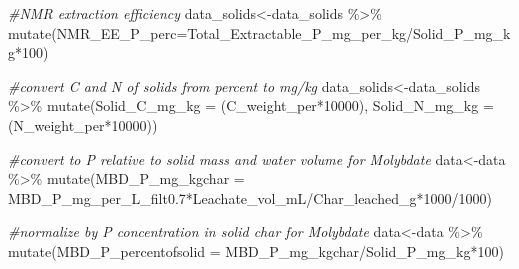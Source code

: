\documentclass[
]{article}
\newenvironment{Shaded}{\begin{snugshade}}{\end{snugshade}}
\newcommand{\AttributeTok}[1]{\textcolor[rgb]{0.77,0.63,0.00}{#1}}
\newcommand{\CommentTok}[1]{\textcolor[rgb]{0.56,0.35,0.01}{\textit{#1}}}
\newcommand{\DecValTok}[1]{\textcolor[rgb]{0.00,0.00,0.81}{#1}}
\newcommand{\FloatTok}[1]{\textcolor[rgb]{0.00,0.00,0.81}{#1}}
\newcommand{\FunctionTok}[1]{\textcolor[rgb]{0.00,0.00,0.00}{#1}}
\newcommand{\NormalTok}[1]{#1}
\newcommand{\OtherTok}[1]{\textcolor[rgb]{0.56,0.35,0.01}{#1}}
\newcommand{\SpecialCharTok}[1]{\textcolor[rgb]{0.00,0.00,0.00}{#1}}
\begin{document}
\begin{Shaded}
\begin{Highlighting}[]
\CommentTok{\#NMR extraction efficiency}
\NormalTok{data\_solids}\OtherTok{\textless{}{-}}\NormalTok{data\_solids }\SpecialCharTok{\%\textgreater{}\%}
  \FunctionTok{mutate}\NormalTok{(}\AttributeTok{NMR\_EE\_P\_perc=}\NormalTok{Total\_Extractable\_P\_mg\_per\_kg}\SpecialCharTok{/}\NormalTok{Solid\_P\_mg\_kg}\SpecialCharTok{*}\DecValTok{100}\NormalTok{)}

\CommentTok{\#convert C and N of solids from percent to mg/kg}
\NormalTok{data\_solids}\OtherTok{\textless{}{-}}\NormalTok{data\_solids }\SpecialCharTok{\%\textgreater{}\%}
  \FunctionTok{mutate}\NormalTok{(}\AttributeTok{Solid\_C\_mg\_kg =}\NormalTok{ (C\_weight\_per}\SpecialCharTok{*}\DecValTok{10000}\NormalTok{),}
  \AttributeTok{Solid\_N\_mg\_kg =}\NormalTok{ (N\_weight\_per}\SpecialCharTok{*}\DecValTok{10000}\NormalTok{))}


\CommentTok{\#convert to P relative to solid mass and water volume for Molybdate}
\NormalTok{data}\OtherTok{\textless{}{-}}\NormalTok{data }\SpecialCharTok{\%\textgreater{}\%}
  \FunctionTok{mutate}\NormalTok{(}\AttributeTok{MBD\_P\_mg\_kgchar =}\NormalTok{ MBD\_P\_mg\_per\_L\_filt0}\FloatTok{.7}\SpecialCharTok{*}\NormalTok{Leachate\_vol\_mL}\SpecialCharTok{/}\NormalTok{Char\_leached\_g}\SpecialCharTok{*}\DecValTok{1000}\SpecialCharTok{/}\DecValTok{1000}\NormalTok{) }

\CommentTok{\#normalize by P concentration in solid char for Molybdate}
\NormalTok{data}\OtherTok{\textless{}{-}}\NormalTok{data }\SpecialCharTok{\%\textgreater{}\%}
  \FunctionTok{mutate}\NormalTok{(}\AttributeTok{MBD\_P\_percentofsolid =}\NormalTok{ MBD\_P\_mg\_kgchar}\SpecialCharTok{/}\NormalTok{Solid\_P\_mg\_kg}\SpecialCharTok{*}\DecValTok{100}\NormalTok{)}


\end{Highlighting}
\end{Shaded}
\end{document}

